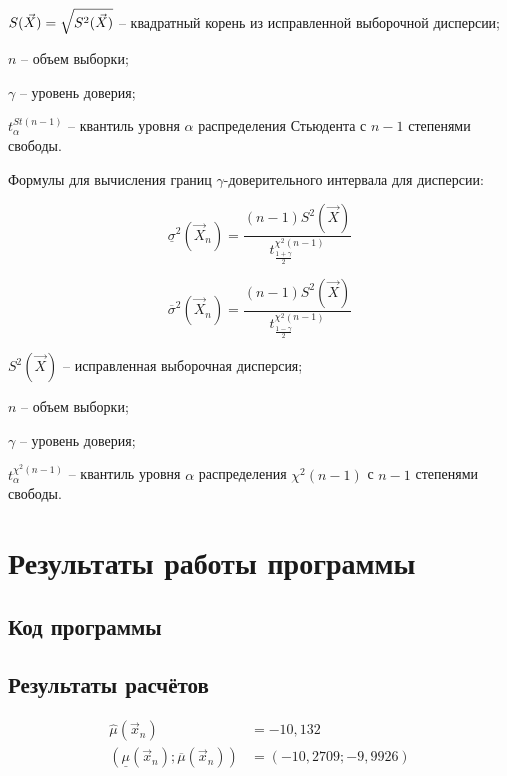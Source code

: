 $S(\vec X) = \sqrtsign{S^2(\vec X)}$ -- квадратный корень из исправленной выборочной дисперсии;

$n$ -- объем выборки;

$\gamma$ -- уровень доверия;

$t^{St(n-1)}_{\alpha}$ -- квантиль уровня $\alpha$ распределения Стьюдента с $n - 1$ степенями свободы.

Формулы для вычисления границ $\gamma$-доверительного интервала для дисперсии:

\begin{equation}
\underline\sigma^2(\vec X_n)= \frac{(n-1)S^2(\vec X)}{t^{\chi^2(n-1)}_{\frac{1+\gamma}{2}}}
\end{equation}

\begin{equation}
\overline\sigma^2(\vec X_n)= \frac{(n-1)S^2(\vec X)}{t^{\chi^2(n-1)}_{\frac{1-\gamma}{2}}}
\end{equation}

$S^2(\vec X)$ -- исправленная выборочная дисперсия;

$n$ -- объем выборки;

$\gamma$ -- уровень доверия;

$t^{\chi^2(n-1)}_{\alpha}$ -- квантиль уровня $\alpha$ распределения $\chi^2(n-1)$ с $n - 1$ степенями свободы.


\chapter*{Результаты работы программы}

\section{Код программы}


\clearpage


\section{Результаты расчётов}

\begin{align*}
    \hat\mu(\vec x_n) &= -10,132\\
    (\underline\mu(\vec x_n); \overline\mu(\vec x_n)) &= (-10,2709;  -9,9926)\\
\end{align*}

